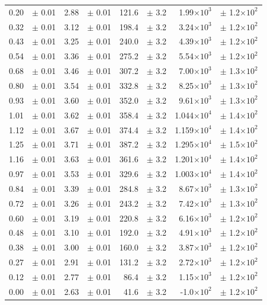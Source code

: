 \documentclass[a4paper]{article}
\begin{document}
\begin{center}
\begin{longtable}[htbp]{rlrlrlrl}
0.20 & $\pm$ 0.01 & 2.88 & $\pm$ 0.01 & 121.6 & $\pm$ 3.2 & 1.99$\times 10^{3}$ & $\pm$ 1.2$\times 10^{2}$ \\ 
0.32 & $\pm$ 0.01 & 3.12 & $\pm$ 0.01 & 198.4 & $\pm$ 3.2 & 3.24$\times 10^{3}$ & $\pm$ 1.2$\times 10^{2}$ \\ 
0.43 & $\pm$ 0.01 & 3.25 & $\pm$ 0.01 & 240.0 & $\pm$ 3.2 & 4.39$\times 10^{3}$ & $\pm$ 1.2$\times 10^{2}$ \\ 
0.54 & $\pm$ 0.01 & 3.36 & $\pm$ 0.01 & 275.2 & $\pm$ 3.2 & 5.54$\times 10^{3}$ & $\pm$ 1.2$\times 10^{2}$ \\ 
0.68 & $\pm$ 0.01 & 3.46 & $\pm$ 0.01 & 307.2 & $\pm$ 3.2 & 7.00$\times 10^{3}$ & $\pm$ 1.3$\times 10^{2}$ \\ 
0.80 & $\pm$ 0.01 & 3.54 & $\pm$ 0.01 & 332.8 & $\pm$ 3.2 & 8.25$\times 10^{3}$ & $\pm$ 1.3$\times 10^{2}$ \\ 
0.93 & $\pm$ 0.01 & 3.60 & $\pm$ 0.01 & 352.0 & $\pm$ 3.2 & 9.61$\times 10^{3}$ & $\pm$ 1.3$\times 10^{2}$ \\ 
1.01 & $\pm$ 0.01 & 3.62 & $\pm$ 0.01 & 358.4 & $\pm$ 3.2 & 1.044$\times 10^{4}$ & $\pm$ 1.4$\times 10^{2}$ \\ 
1.12 & $\pm$ 0.01 & 3.67 & $\pm$ 0.01 & 374.4 & $\pm$ 3.2 & 1.159$\times 10^{4}$ & $\pm$ 1.4$\times 10^{2}$ \\ 
1.25 & $\pm$ 0.01 & 3.71 & $\pm$ 0.01 & 387.2 & $\pm$ 3.2 & 1.295$\times 10^{4}$ & $\pm$ 1.5$\times 10^{2}$ \\ 
1.16 & $\pm$ 0.01 & 3.63 & $\pm$ 0.01 & 361.6 & $\pm$ 3.2 & 1.201$\times 10^{4}$ & $\pm$ 1.4$\times 10^{2}$ \\ 
0.97 & $\pm$ 0.01 & 3.53 & $\pm$ 0.01 & 329.6 & $\pm$ 3.2 & 1.003$\times 10^{4}$ & $\pm$ 1.4$\times 10^{2}$ \\ 
0.84 & $\pm$ 0.01 & 3.39 & $\pm$ 0.01 & 284.8 & $\pm$ 3.2 & 8.67$\times 10^{3}$ & $\pm$ 1.3$\times 10^{2}$ \\ 
0.72 & $\pm$ 0.01 & 3.26 & $\pm$ 0.01 & 243.2 & $\pm$ 3.2 & 7.42$\times 10^{3}$ & $\pm$ 1.3$\times 10^{2}$ \\ 
0.60 & $\pm$ 0.01 & 3.19 & $\pm$ 0.01 & 220.8 & $\pm$ 3.2 & 6.16$\times 10^{3}$ & $\pm$ 1.2$\times 10^{2}$ \\ 
0.48 & $\pm$ 0.01 & 3.10 & $\pm$ 0.01 & 192.0 & $\pm$ 3.2 & 4.91$\times 10^{3}$ & $\pm$ 1.2$\times 10^{2}$ \\ 
0.38 & $\pm$ 0.01 & 3.00 & $\pm$ 0.01 & 160.0 & $\pm$ 3.2 & 3.87$\times 10^{3}$ & $\pm$ 1.2$\times 10^{2}$ \\ 
0.27 & $\pm$ 0.01 & 2.91 & $\pm$ 0.01 & 131.2 & $\pm$ 3.2 & 2.72$\times 10^{3}$ & $\pm$ 1.2$\times 10^{2}$ \\ 
0.12 & $\pm$ 0.01 & 2.77 & $\pm$ 0.01 & 86.4 & $\pm$ 3.2 & 1.15$\times 10^{3}$ & $\pm$ 1.2$\times 10^{2}$ \\ 
0.00 & $\pm$ 0.01 & 2.63 & $\pm$ 0.01 & 41.6 & $\pm$ 3.2 & -1.0$\times 10^{2}$ & $\pm$ 1.2$\times 10^{2}$ \\
\hline
\end{longtable}
\end{center}
\newpage
\end{document}
